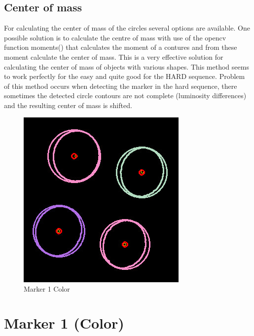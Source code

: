 \subsection{Center of mass}
For calculating the center of mass of the circles several options are available.
One possible solution is to calculate the centre of mass with use of the opencv function
moments() that calculates the moment of a contures and from these moment calculate the
center of mass. This is a very effective solution for calculating the center of mass of
objects with various shapes. This method seems to work perfectly for the easy and quite good
for the HARD sequence. Problem of this method occurs when detecting the marker in the hard sequence,
there sometimes the detected circle contours are not complete (luminosity differences) and the resulting
center of mass is shifted. 

\begin{figure}[ht!]
	\centering
	\includegraphics[width=\textwidth]{figures/Marker1centers}
	\caption{Marker 1 Color}
	\label{fig:markerColorcenter1}
\end{figure}
\section{Marker 1 (Color)} 

